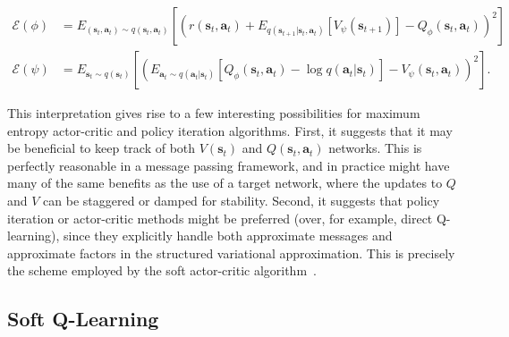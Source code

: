 \begin{align}
\mathcal{E}(\phi) &= E_{(\mathbf{s}_t,\mathbf{a}_t) \sim q(\mathbf{s}_t,\mathbf{a}_t)}\left[ \left( r(\mathbf{s}_t,\mathbf{a}_t) + E_{q(\mathbf{s}_{t+1}|\mathbf{s}_t,\mathbf{a}_t)}[V_\psi(\mathbf{s}_{t+1})] - Q_\phi(\mathbf{s}_t,\mathbf{a}_t) \right)^2 \right] \label{eq:qerror} \\
\mathcal{E}(\psi) &= E_{\mathbf{s}_t \sim q(\mathbf{s}_t)}\left[ \left(
E_{\mathbf{a}_t \sim q(\mathbf{a}_t|\mathbf{s}_t)} [ Q_\phi(\mathbf{s}_t,\mathbf{a}_t) - \log q(\mathbf{a}_t|\mathbf{s}_t) ] - V_\psi(\mathbf{s}_t,\mathbf{a}_t)
\right)^2 \right]. \nonumber
\end{align}

This interpretation gives rise to a few interesting possibilities for maximum entropy actor-critic and policy iteration algorithms. First, it suggests that it may be beneficial to keep track of both $V(\mathbf{s}_t)$ and $Q(\mathbf{s}_t,\mathbf{a}_t)$ networks. This is perfectly reasonable in a message passing framework, and in practice might have many of the same benefits as the use of a target network, where the updates to $Q$ and $V$ can be staggered or damped for stability. Second, it suggests that policy iteration or actor-critic methods might be preferred (over, for example, direct Q-learning), since they explicitly handle both approximate messages and approximate factors in the structured variational approximation. This is precisely the scheme employed by the soft actor-critic algorithm~\citep{sac}.

\subsection{Soft Q-Learning}
\label{sec:softqlearning}

